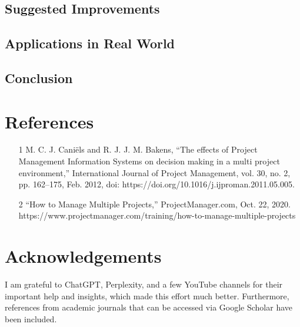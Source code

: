 \documentclass[runningheads]{llncs}
\begin{document}
\subsection{Suggested Improvements}

\subsection{Applications in Real World}

\subsection{Conclusion}


\section{References}
\begin{enumerate}
  \item [1]M. C. J. Caniëls and R. J. J. M. Bakens, “The effects of Project Management Information Systems on decision making in a multi project environment,” International Journal of Project Management, vol. 30, no. 2, pp. 162–175, Feb. 2012, doi: https://doi.org/10.1016/j.ijproman.2011.05.005.
‌
‌
  \item [2]“How to Manage Multiple Projects,” ProjectManager.com, Oct. 22, 2020. https://www.projectmanager.com/training/how-to-manage-multiple-projects

\end{enumerate}


\section{Acknowledgements}
I am grateful to ChatGPT, Perplexity, and a few YouTube channels for their important help and insights, which made this effort much better. Furthermore, references from academic journals that can be accessed via Google Scholar have been included.
\end{document}
